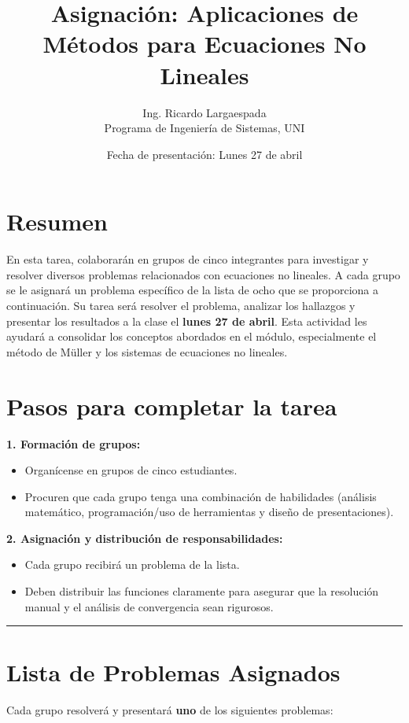 \documentclass[12pt,letterpaper]{article}
\title{\textbf{Asignación: Aplicaciones de Métodos para Ecuaciones No Lineales}}
\author{Ing. Ricardo Largaespada \\ Programa de Ingeniería de Sistemas, UNI}
\date{Fecha de presentación: Lunes 27 de abril}
\begin{document}
\maketitle

\section*{Resumen}
En esta tarea, colaborarán en grupos de cinco integrantes para investigar y resolver diversos problemas relacionados con ecuaciones no lineales. A cada grupo se le asignará un problema específico de la lista de ocho que se proporciona a continuación. Su tarea será resolver el problema, analizar los hallazgos y presentar los resultados a la clase el \textbf{lunes 27 de abril}. Esta actividad les ayudará a consolidar los conceptos abordados en el módulo, especialmente el método de Müller y los sistemas de ecuaciones no lineales.

\section*{Pasos para completar la tarea}

\textbf{1. Formación de grupos:}
\begin{itemize}
    \item Organícense en grupos de cinco estudiantes.
    \item Procuren que cada grupo tenga una combinación de habilidades (análisis matemático, programación/uso de herramientas y diseño de presentaciones).
\end{itemize}

\textbf{2. Asignación y distribución de responsabilidades:}
\begin{itemize}
    \item Cada grupo recibirá un problema de la lista.
    \item Deben distribuir las funciones claramente para asegurar que la resolución manual y el análisis de convergencia sean rigurosos.
\end{itemize}

\vspace{0.5cm}
\hrule
\vspace{0.5cm}

\section*{Lista de Problemas Asignados}

Cada grupo resolverá y presentará \textbf{uno} de los siguientes problemas:
\end{document}
